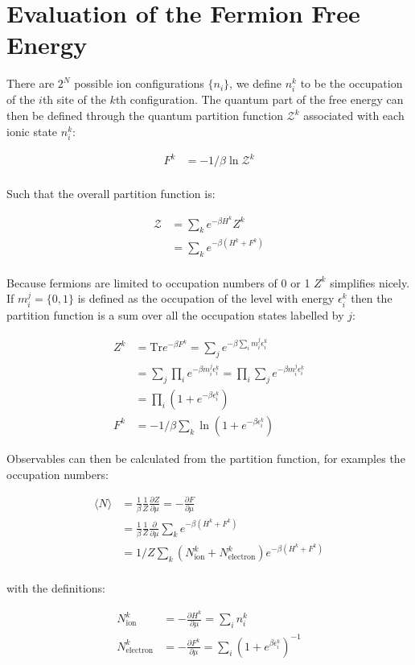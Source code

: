 \hypertarget{evaluation-of-the-fermion-free-energy}{%
\section{Evaluation of the Fermion Free Energy}\label{evaluation-of-the-fermion-free-energy}}

There are \(2^N\) possible ion configurations \(\{ n_i \}\), we define \(n^k_i\) to be the occupation of the \(i\)th site of the \(k\)th configuration. The quantum part of the free energy can then be defined through the quantum partition function \(\mathcal{Z}^k\) associated with each ionic state \(n^k_i\):

\[\begin{aligned}
F^k &= -1/\beta \ln{\mathcal{Z}^k} \\
\end{aligned}\]

Such that the overall partition function is:

\[\begin{aligned}
\mathcal{Z} &= \sum_k e^{- \beta H^k} Z^k \\
&= \sum_k e^{-\beta (H^k + F^k)} \\
\end{aligned}\]

Because fermions are limited to occupation numbers of 0 or 1 \(Z^k\) simplifies nicely. If \(m^j_i = \{0,1\}\) is defined as the occupation of the level with energy \(\epsilon^k_i\) then the partition function is a sum over all the occupation states labelled by \(j\):

\[\begin{aligned}
Z^k    &= \mathrm{Tr} e^{-\beta F^k} = \sum_j e^{-\beta \sum_i m^j_i \epsilon^k_i}\\
       &= \sum_j \prod_i e^{- \beta m^j_i \epsilon^k_i}= \prod_i \sum_j e^{- \beta m^j_i \epsilon^k_i}\\
       &= \prod_i (1 + e^{- \beta \epsilon^k_i})\\
F^k    &= -1/\beta \sum_k \ln{(1 + e^{- \beta \epsilon^k_i})}
\end{aligned}\]

Observables can then be calculated from the partition function, for examples the occupation numbers:

\[\begin{aligned}
\langle N \rangle &= \frac{1}{\beta} \frac{1}{Z} \frac{\partial Z}{\partial \mu} = - \frac{\partial F}{\partial \mu}\\
    &= \frac{1}{\beta} \frac{1}{Z} \frac{\partial}{\partial \mu} \sum_k e^{-\beta (H^k + F^k)}\\
    &= 1/Z \sum_k (N^k_{\mathrm{ion}} + N^k_{\mathrm{electron}}) e^{-\beta (H^k + F^k)}\\
\end{aligned}\]

with the definitions:

\[\begin{aligned}
N^k_{\mathrm{ion}} &= - \frac{\partial H^k}{\partial \mu} = \sum_i n^k_i\\
N^k_{\mathrm{electron}} &= - \frac{\partial F^k}{\partial \mu} = \sum_i \left(1 + e^{\beta \epsilon^k_i}\right)^{-1}\\
\end{aligned}\]
